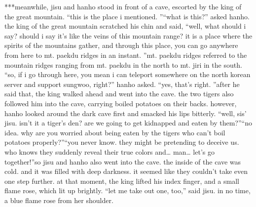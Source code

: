 ***meanwhile, jisu and hanho stood in front of a cave, escorted by the king of the great mountain.
“this is the place i mentioned.
”“what is this?” asked hanho.
the king of the great mountain scratched his chin and said, “well, what should i say? should i say it’s like the veins of this mountain range? it is a place where the spirits of the mountains gather, and through this place, you can go anywhere from here to mt.
 paekdu ridges in an instant.
”mt.
 paekdu ridges referred to the mountain ridges ranging from mt.
 paekdu in the north to mt.
 jiri in the south.
“so, if i go through here, you mean i can teleport somewhere on the north korean server and support sungwoo, right?” hanho asked.
“yes, that’s right.
”after he said that, the king walked ahead and went into the cave.
 the two tigers also followed him into the cave, carrying boiled potatoes on their backs.
however, hanho looked around the dark cave first and smacked his lips bitterly.
“well, sis’ jisu.
 isn’t it a tiger’s den? are we going to get kidnapped and eaten by them?”“no idea.
 why are you worried about being eaten by the tigers who can’t boil potatoes properly?”“you never know.
 they might be pretending to deceive us.
 who knows they suddenly reveal their true colors and… man… let’s go together!”so jisu and hanho also went into the cave.
the inside of the cave was cold.
 and it was filled with deep darkness.
 it seemed like they couldn’t take even one step further.
at that moment, the king lifted his index finger, and a small flame rose, which lit up brightly.
“let me take out one, too,” said jisu.
in no time, a blue flame rose from her shoulder.


 
